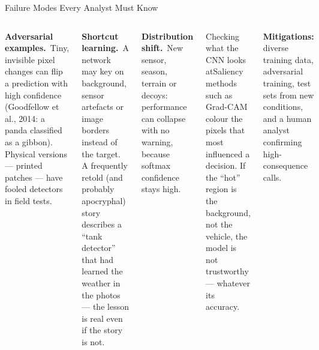 \documentclass[aspectratio=169,10pt]{beamer}
\begin{document}
\begin{frame}{Failure Modes Every Analyst Must Know}
\begin{columns}[T]
\begin{wbox}\textbf{Adversarial examples.}\ \scriptsize Tiny, invisible pixel changes can flip a prediction with high confidence (Goodfellow et al., 2014: a panda classified as a gibbon). Physical versions --- printed patches --- have fooled detectors in field tests.\end{wbox}
\begin{wbox}\textbf{Shortcut learning.}\ \scriptsize A network may key on background, sensor artefacts or image borders instead of the target. A frequently retold (and probably apocryphal) story describes a ``tank detector'' that had learned the weather in the photos --- the lesson is real even if the story is not.\end{wbox}
\begin{wbox}\textbf{Distribution shift.}\ \scriptsize New sensor, season, terrain or decoys: performance can collapse with no warning, because softmax confidence stays high.\end{wbox}
\begin{cbox}{Checking what the CNN looks at}\scriptsize Saliency methods such as Grad-CAM colour the pixels that most influenced a decision. If the ``hot'' region is the background, not the vehicle, the model is not trustworthy --- whatever its accuracy.\end{cbox}
\begin{rbox}\scriptsize\textbf{Mitigations:} diverse training data, adversarial training, test sets from new conditions, and a human analyst confirming high-consequence calls.\end{rbox}
\end{columns}
\end{frame}
\end{document}
